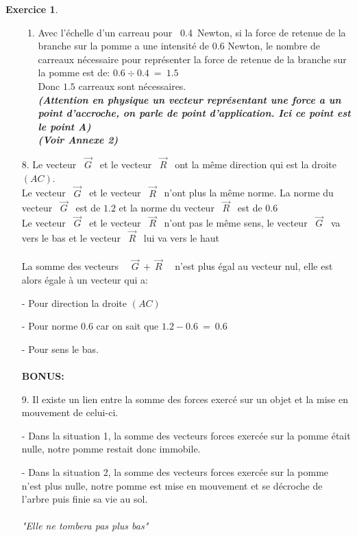 \documentclass[a4paper,10.9pt]{article}
\theoremstyle{definition}
\newtheorem{exo}{Exercice}
\begin{document}
\begin{exo}
\begin{enumerate}
\begin{enumerate}
		\item Avec l'échelle d'un carreau pour ~0.4~Newton, si la force de retenue de la branche sur la pomme a une intensité de $0.6$ Newton, le nombre de carreaux nécessaire pour représenter la force de retenue de la branche sur la pomme est de: \quad $0.6 \div 0.4 \ = \ 1.5$\\
		Donc $1.5$ carreaux sont nécessaires.\
		\\ \textit{\textbf{(Attention en physique un vecteur représentant une force a un point d'accroche, on parle de point d'application. Ici ce point est le point A)}}\\ \textbf{\textit{(Voir Annexe 2)}}\\
	\end{enumerate}
	\item[8.] Le vecteur ~$\vec{G}$~ et le vecteur ~$\vec{R}$~ ont la même direction qui est la droite $\left(AC\right)$.\\
	Le vecteur ~$\vec{G}$~ et le vecteur ~$\vec{R}$~ n'ont plus la même norme. La norme du vecteur ~$\vec{G}$~ est de $1.2$ et la norme du vecteur ~$\vec{R}$~ est de $0.6$ \\
	Le vecteur ~$\vec{G}$~ et le vecteur ~$\vec{R}$~ n'ont  pas le même sens, le vecteur ~$\vec{G}$~ va vers le bas et le vecteur ~$\vec{R}$~ lui va vers le haut\\\\
	La somme des vecteurs ~~$\vec{G} \ + \ \vec{R}$~~ n'est plus égal au vecteur nul, elle est alors égale à un vecteur qui a:
	\item[-] Pour direction la droite $\left(AC\right)$
	\item[-] Pour norme $0.6$ car on sait que  $1.2 - 0.6 \ = \ 0.6$ 
	\item[-] Pour sens le bas. \\\\
	\textbf{BONUS:}\\
	\item[9.] Il existe un lien entre la somme des forces exercé sur un objet et la mise en mouvement de celui-ci.
	 \item[-]Dans la situation 1, la somme  des vecteurs forces exercée sur la pomme était nulle, notre pomme restait donc immobile.
	\item[-]Dans la situation 2, la somme  des vecteurs forces exercée sur la pomme n'est plus nulle, notre pomme est mise en mouvement et se décroche de l'arbre puis finie sa vie au sol.\\\\
	\textit{"Elle ne tombera pas plus bas"}
	

\end{enumerate}
\end{exo}
\end{document}

